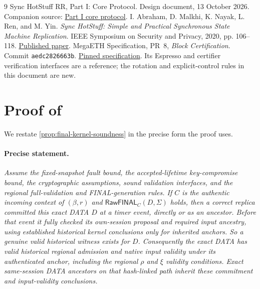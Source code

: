 \documentclass[11pt,a4paper]{article}
\newcommand{\tagg}[1]{\ensuremath{\mathsf{#1}}}
\newcounter{protocol}
\begin{document}
\begingroup\small
\begin{thebibliography}{9}
Sync HotStuff RR, Part I: Core Protocol. Design document, 13 October 2026.
Companion source: \href{run:sync_hotstuff_rr_part1_core.tex}{Part I core protocol}.
I. Abraham, D. Malkhi, K. Nayak, L. Ren, and M. Yin.
\emph{Sync HotStuff: Simple and Practical Synchronous State Machine Replication}.
IEEE Symposium on Security and Privacy, 2020, pp. 106--118.
\href{https://conferences.computer.org/sp/pdfs/sp/2020/349700a106.pdf}{Published paper}.
MegaETH Specification, PR~8, \emph{Block Certification}.
Commit \texttt{aedc2826663b}.
\href{https://github.com/megaeth-labs/specification/tree/aedc2826663b134ee25d26bea17e70c6d23d321c/specs/block-certification}{Pinned specification}.
Its Espresso and certifier verification interfaces are a reference;
the rotation and explicit-control rules in this document are new.
\end{thebibliography}
\endgroup
\appendix
{}
\section{Proof of \texorpdfstring{}{the FINAL kernel proposition}}
\label{app:final-kernel-proof}
We restate \cref{prop:final-kernel-soundness} in the precise form the
proof uses.

\paragraph{Precise statement.}
\textit{Assume the fixed-snapshot fault bound, the accepted-lifetime
key-compromise bound, the cryptographic assumptions, sound validation
interfaces, and the regional full-validation and FINAL-generation rules.
If $C$ is the authentic incoming context of $(\beta,r)$ and
$\tagg{RawFINAL}_C(D,\Sigma)$ holds, then a correct replica committed
this exact DATA $D$ at a timer event, directly or as an ancestor. Before
that event it fully checked its own-session proposal and required input
ancestry, using established historical kernel conclusions only for
inherited anchors. So a genuine valid historical witness exists for $D$.
Consequently the exact DATA has valid historical regional admission and
native input validity under its authenticated anchor, including the
regional $\rho$ and $\xi$ validity conditions. Exact same-session DATA
ancestors on that hash-linked path inherit these commitment and
input-validity conclusions.}
\end{document}
